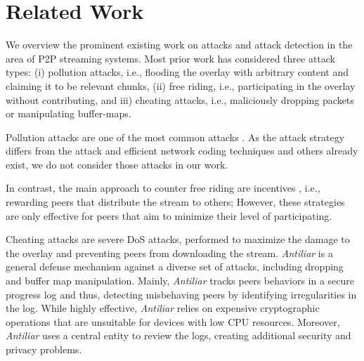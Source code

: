 \section{Related Work}
\label{sec:related}

We overview the prominent existing work on attacks and attack detection in the area of P2P streaming systems. Most prior work has considered three attack types: (i) pollution attacks, i.e., flooding the overlay with arbitrary content and claiming it to be relevant chunks, (ii) free riding, i.e., participating in the overlay without contributing, and iii) cheating attacks, i.e., maliciously dropping packets or manipulating buffer-maps. 

Pollution attacks are one of the most common attacks \cite{pollution1}. 
As the attack strategy differs from the \drop attack and efficient network coding techniques \cite{nc} and others \cite{pollution2} already exist, we do not consider those attacks in our work.

In contrast, the main approach to counter free riding are incentives \cite{defending,defending2}, i.e., rewarding peers that distribute the stream to others; 
However, these strategies are only effective for peers that aim to minimize their level of participating. 

Cheating attacks are severe DoS attacks, performed to maximize the damage to the overlay and preventing peers from downloading the stream.   
\textit{Antiliar} is a general defense mechanism against a diverse set of attacks, including dropping and buffer map manipulation\cite{antiliar}.
Mainly, \textit{Antiliar} tracks peers behaviors in a secure progress log and thus, detecting misbehaving peers by identifying irregularities in the log. 
While highly effective, \textit{Antiliar} relies on expensive cryptographic operations that are unsuitable for devices with low CPU resources.
Moreover, \textit{Antiliar} uses a central entity to review the logs, creating additional security and privacy problems. 


